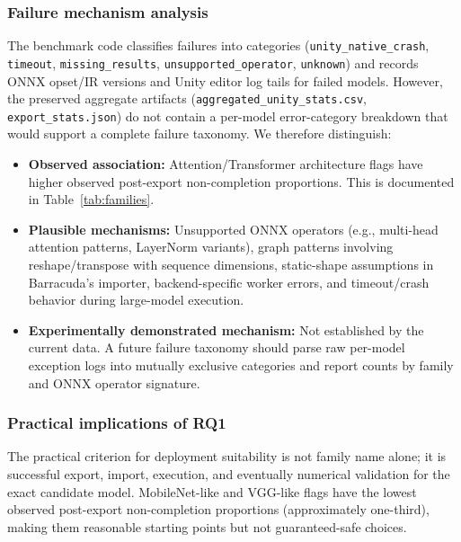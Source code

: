 \documentclass[10pt,twocolumn]{article}
\begin{document}
\subsubsection{Failure mechanism analysis}

The benchmark code classifies failures into categories (\texttt{unity\_native\_crash}, \texttt{timeout}, \texttt{missing\_results}, \texttt{unsupported\_operator}, \texttt{unknown}) and records ONNX opset/IR versions and Unity editor log tails for failed models. However, the preserved aggregate artifacts (\texttt{aggregated\_unity\_stats.csv}, \texttt{export\_stats.json}) do not contain a per-model error-category breakdown that would support a complete failure taxonomy. We therefore distinguish:

\begin{itemize}[nosep,leftmargin=*]
  \item \textbf{Observed association:} Attention/Transformer architecture flags have higher observed post-export non-completion proportions. This is documented in Table~\ref{tab:families}.
  \item \textbf{Plausible mechanisms:} Unsupported ONNX operators (e.g., multi-head attention patterns, LayerNorm variants), graph patterns involving reshape/transpose with sequence dimensions, static-shape assumptions in Barracuda's importer, backend-specific worker errors, and timeout/crash behavior during large-model execution.
  \item \textbf{Experimentally demonstrated mechanism:} Not established by the current data. A future failure taxonomy should parse raw per-model exception logs into mutually exclusive categories and report counts by family and ONNX operator signature.
\end{itemize}

\subsubsection{Practical implications of RQ1}

The practical criterion for deployment suitability is not family name alone; it is successful export, import, execution, and eventually numerical validation for the exact candidate model. MobileNet-like and VGG-like flags have the lowest observed post-export non-completion proportions (approximately one-third), making them reasonable starting points but not guaranteed-safe choices.

\end{document}
